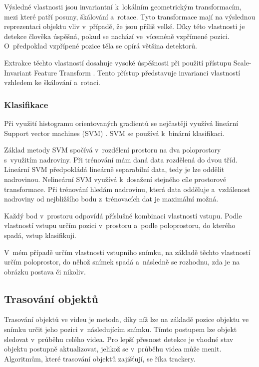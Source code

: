 Výsledné vlastnosti jsou invariantní k~lokálním geometrickým transformacím, mezi které patří posuny, škálování a~rotace. Tyto transformace mají na výslednou reprezentaci objektu vliv v~případě, že jsou příliš velké. Díky této vlastnosti je detekce člověka úspěšná, pokud se nachází ve~víceméně vzpřímené pozici. O~předpoklad vzpřípené pozice těla se opírá většina detektorů.

Extrakce těchto vlastností dosahuje vysoké úspěšnosti při použití přístupu Scale-Invariant Feature Transform \citep{SIFT}. Tento přístup představuje invarianci vlastností vzhledem ke škálování a~rotaci.


\subsubsection{Klasifikace}

Při využití histogramu orientovaných gradientů se nejčastěji využívá lineární Support vector machines (SVM) \citep{SVM}. SVM se používá k~binární klasifikaci.

Základ metody SVM spočívá v~rozdělení prostoru na dva poloprostory s~využitím nadroviny. Při trénování mám daná data rozdělená do dvou tříd. Lineární SVM předpokládá lineárně separabilní data, tedy je lze oddělit nadrovinou. Nelineární SVM využívá k~dosažení stejného cíle prostorové transformace. Při trénování hledám nadrovinu, která data odděluje a~vzdálenost nadroviny od nejbližšího bodu z~trénovacích dat je maximální možná.

Každý bod v~prostoru odpovídá příslušné kombinaci vlastností vstupu. Podle vlastností vstupu určím pozici v~prostoru a~podle poloprostoru, do kterého spadá, vstup klasifikuji.

V~mém případě určím vlastnosti vstupního snímku, na základě těchto vlastností určím poloprostor, do něhož snímek spadá a~následně se rozhodnu, zda je na obrázku postava či nikoliv.



\subsection{Trasování objektů}

Trasování objektů ve videu je metoda, díky níž lze na základě pozice objektu ve snímku určit jeho pozici v~následujícím snímku. Tímto postupem lze objekt sledovat v~průběhu celého videa. Pro lepší přesnost detekce je vhodné stav objektu postupně aktualizovat, jelikož se v~průběhu videa může menit. Algoritmům, které trasování objektů zajišťují, se říka trackery.

